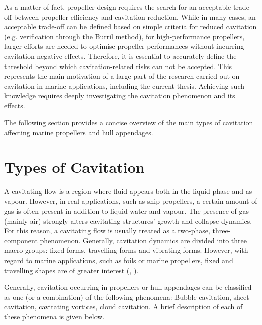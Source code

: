 As a matter of fact, propeller design requires the search for an acceptable trade-off between propeller efficiency and cavitation reduction. While in many cases, an acceptable trade-off can be defined based on simple criteria for reduced cavitation (e.g. verification through the Burril method), for high-performance propellers, larger efforts are needed to optimise propeller performances without incurring cavitation negative effects.
Therefore, it is essential to accurately define the threshold beyond which cavitation-related risks can not be accepted.
This represents the main motivation of a large part of the research carried out on cavitation in  marine applications, including the current thesis. Achieving such knowledge requires deeply investigating the cavitation phenomenon and its effects.

The following section provides a concise overview of the main types of cavitation affecting marine propellers and hull appendages.

\section{Types of Cavitation}

A cavitating flow is a region where fluid appears both in the liquid phase and as vapour. However, in real applications, such as ship propellers, a certain amount of gas is often present in addition to liquid water and vapour. The presence of gas (mainly air) strongly alters cavitating structures' growth and collapse dynamics. For this reason, a cavitating flow is usually treated as a two-phase, three-component phenomenon.
Generally, cavitation dynamics are divided into three macro-groups: fixed forms, travelling forms and vibrating forms. However, with regard to marine applications, such as foils or marine propellers, fixed and travelling shapes are of greater interest (\cite{carlton2018marine}, \cite{knapp1970cavitation}). 

Generally, cavitation occurring in propellers or hull appendages can be classified as one (or a combination) of the following phenomena:
Bubble cavitation, sheet cavitation, cavitating vortices, cloud cavitation.
A brief description of each of these phenomena is given below. 

